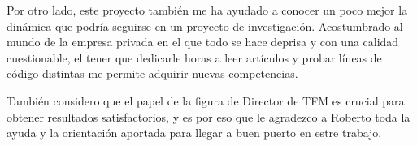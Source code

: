 Por otro lado, este proyecto también me ha ayudado a conocer un poco mejor la dinámica que podría seguirse en un proyceto de investigación. Acostumbrado al mundo de la empresa privada en el que todo se hace deprisa y con una calidad cuestionable, el tener que dedicarle horas a leer artículos y probar líneas de código distintas me permite adquirir nuevas competencias.

También considero que el papel de la figura de Director de TFM es crucial para obtener resultados satisfactorios, y es por eso que le agradezco a Roberto toda la ayuda y la orientación aportada para llegar a buen puerto en estre trabajo.






















